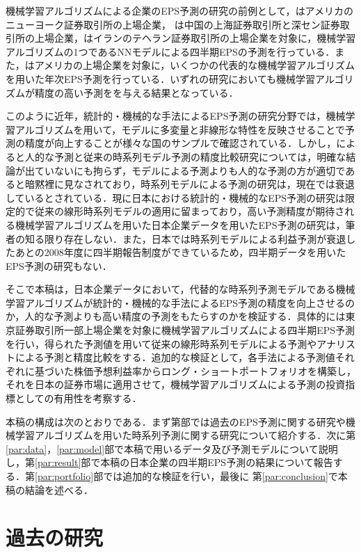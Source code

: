 \documentclass[a4paper，12pt]{jsarticle}
\begin{document}
機械学習アルゴリズムによる企業のEPS予測の研究の前例として，\cite{zhang2004neural}はアメリカのニューヨーク証券取引所の上場企業，\cite*{cao2009forecasting} は中国の上海証券取引所と深セン証券取引所の上場企業，\cite{etemadi2015earnings}はイランのテヘラン証券取引所の上場企業を対象に，機械学習アルゴリズムの1つであるNNモデルによる四半期EPSの予測を行っている．また，\cite*{cao2020fundamental}はアメリカの上場企業を対象に，いくつかの代表的な機械学習アルゴリズムを用いた年次EPS予測を行っている．いずれの研究においても機械学習アルゴリズムが精度の高い予測をを与える結果となっている．

このように近年，統計的・機械的な手法によるEPS予測の研究分野では，機械学習アルゴリズムを用いて，モデルに多変量と非線形な特性を反映させることで予測の精度が向上することが様々な国のサンプルで確認されている．しかし，\cite{ota2006}によると人的な予測と従来の時系列モデル予測の精度比較研究については，明確な結論が出ていないにも拘らず，モデルによる予測よりも人的な予測の方が適切であると暗黙裡に見なされており，時系列モデルによる予測の研究は，現在では衰退しているとされている．現に日本における統計的・機械的なEPS予測の研究は限定的で従来の線形時系列モデルの適用に留まっており，高い予測精度が期待される機械学習アルゴリズムを用いた日本企業データを用いたEPS予測の研究は，筆者の知る限り存在しない．また，日本では時系列モデルによる利益予測が衰退したあとの2008年度に四半期報告制度ができているため，四半期データを用いたEPS予測の研究もない．

そこで本稿は，日本企業データにおいて，代替的な時系列予測モデルである機械学習アルゴリズムが統計的・機械的な手法によるEPS予測の精度を向上させるのか，人的な予測よりも高い精度の予測をもたらすのかを検証する．具体的には東京証券取引所一部上場企業を対象に機械学習アルゴリズムによる四半期EPS予測を行い，得られた予測値を用いて従来の線形時系列モデルによる予測やアナリストによる予測と精度比較をする．追加的な検証として，各手法による予測値それぞれに基づいた株価予想利益率からロング・ショートポートフォリオを構築し，それを日本の証券市場に適用させて，機械学習アルゴリズムによる予測の投資指標としての有用性を考察する．

本稿の構成は次のとおりである．まず第\ref{par:litrev}部では過去のEPS予測に関する研究や機械学習アルゴリズムを用いた時系列予測に関する研究について紹介する．次に第\ref{par:data}，\ref{par:model}部で本稿で用いるデータ及び予測モデルについて説明し，第\ref{par:result}部で本稿の日本企業の四半期EPS予測の結果について報告する．第\ref{par:portfolio}部では追加的な検証を行い，最後に 第\ref{par:conclusion}で本稿の結論を述べる．

\part{過去の研究} \label{par:litrev}
\end{document}
